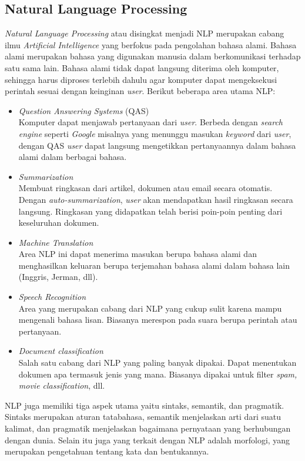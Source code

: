 \subsection{Natural Language Processing\cite{NLA:2003}}
\label{sec:nlp}

\textit{Natural Language Processing} atau disingkat menjadi NLP merupakan cabang ilmu \textit{Artificial Intelligence} yang berfokus pada pengolahan bahasa alami. Bahasa alami merupakan bahasa yang digunakan manusia dalam berkomunikasi terhadap satu sama lain. Bahasa alami tidak dapat langsung diterima oleh komputer, sehingga harus diproses terlebih dahulu agar komputer dapat mengeksekusi perintah sesuai dengan keinginan \textit{user}.  Berikut beberapa area utama NLP:

\begin{itemize}
	\item \textit{Question Answering Systems} (QAS)\\
	Komputer dapat menjawab pertanyaan dari \textit{user}. Berbeda dengan \textit{search engine} seperti \textit{Google} misalnya yang menunggu masukan \textit{keyword} dari \textit{user}, dengan QAS \textit{user} dapat langsung mengetikkan pertanyaannya dalam bahasa alami dalam berbagai bahasa.
	\item \textit{Summarization}\\
	Membuat ringkasan dari artikel, dokumen atau email secara otomatis. Dengan \textit{auto-summarization}, \textit{user} akan mendapatkan hasil ringkasan secara langsung. Ringkasan yang didapatkan telah berisi poin-poin penting dari keseluruhan dokumen.
	\item \textit{Machine Translation}\\
	Area NLP ini dapat menerima masukan berupa bahasa alami dan menghasilkan keluaran berupa terjemahan bahasa alami dalam bahasa lain (Inggris, Jerman, dll).
	\item \textit{Speech Recognition}\\
	Area yang merupakan cabang dari NLP yang cukup sulit karena mampu mengenali bahasa lisan. Biasanya merespon pada suara berupa perintah atau pertanyaan.
	\item \textit{Document classification}\\
	Salah satu cabang dari NLP yang paling banyak dipakai. Dapat menentukan dokumen apa termasuk jenis yang mana. Biasanya dipakai untuk filter \textit{spam, movie classification}, dll.
\end{itemize}

NLP juga memiliki tiga aspek utama yaitu sintaks, semantik, dan pragmatik. Sintaks merupakan aturan tatabahasa, semantik menjelaskan arti dari suatu kalimat, dan pragmatik menjelaskan bagaimana pernyataan yang berhubungan dengan dunia. Selain itu juga yang terkait dengan NLP adalah morfologi, yang merupakan pengetahuan tentang kata dan bentukannya.

